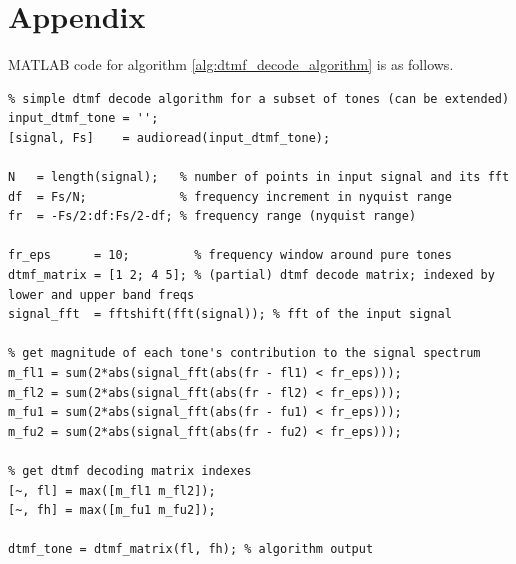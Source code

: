 \documentclass[10pt]{article}
\begin{document}
\newpage
\clearpage
\section*{Appendix}

\textsc{MATLAB} code for algorithm \ref{alg:dtmf_decode_algorithm} is as follows.

\begin{lstlisting}
% simple dtmf decode algorithm for a subset of tones (can be extended)
input_dtmf_tone = '';
[signal, Fs]    = audioread(input_dtmf_tone);

N   = length(signal);   % number of points in input signal and its fft
df  = Fs/N;             % frequency increment in nyquist range
fr  = -Fs/2:df:Fs/2-df; % frequency range (nyquist range)

fr_eps      = 10;         % frequency window around pure tones
dtmf_matrix = [1 2; 4 5]; % (partial) dtmf decode matrix; indexed by lower and upper band freqs
signal_fft  = fftshift(fft(signal)); % fft of the input signal

% get magnitude of each tone's contribution to the signal spectrum
m_fl1 = sum(2*abs(signal_fft(abs(fr - fl1) < fr_eps)));
m_fl2 = sum(2*abs(signal_fft(abs(fr - fl2) < fr_eps)));
m_fu1 = sum(2*abs(signal_fft(abs(fr - fu1) < fr_eps)));
m_fu2 = sum(2*abs(signal_fft(abs(fr - fu2) < fr_eps)));

% get dtmf decoding matrix indexes
[~, fl] = max([m_fl1 m_fl2]);
[~, fh] = max([m_fu1 m_fu2]);

dtmf_tone = dtmf_matrix(fl, fh); % algorithm output
\end{lstlisting}
\end{document}
